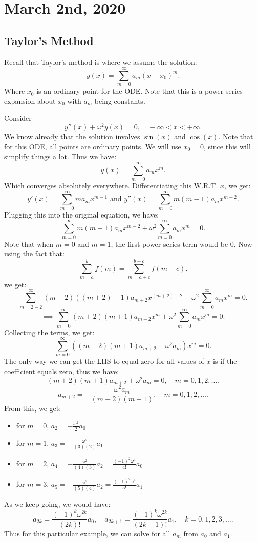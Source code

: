 \documentclass[../main/main.tex]{subfiles}
\begin{document}
\section{March  2nd, 2020}
\subsection{Taylor's Method}
Recall that Taylor's method is where we assume the solution: \[
	y(x) = \sum_{m=0}^{\infty} a_m(x-x_0)^{m}
.\] Where $x_0 $ is an ordinary point for the ODE. Note that this is a power series expansion about $x_0$ with $a_m$ being constants.

	Consider \[y''(x) + \omega^2 y(x) = 0, \quad -\infty < x < +\infty.\] We know already that the solution involves $\sin(x)$ and $\cos(x)$. Note that for this ODE, all points are ordinary points. We will use $x_0=0$, since this will simplify things a lot. Thus we have: \[
		y(x) = \sum_{m=0}^{\infty} a_mx^{m}
	.\] Which converges absolutely everywhere.  Differentiating this W.R.T. $x$, we get: \[
		y'(x) = \sum_{m=0}^{\infty} ma_mx^{m-1}\text{ and } y''(x) = \sum_{m=0}^{\infty} m(m-1)a_mx^{m-2}
	.\] Plugging this into the original equation, we have: \[
	\sum_{m=0}^{\infty} m(m-1)a_mx^{m-2} + \omega^2 \sum_{m=0}^{\infty} a_mx^{m}=0
.\] Note that when $m=0$ and $m=1$, the first power series term would be 0. Now using the fact that: \[
\sum_{m=a}^{b} f(m) = \sum_{m=a\pm c}^{b\pm c} f(m \mp c)
.\] we get: \[
\sum_{m=2-2}^{\infty} (m+2)((m+2)-1)a_{m+2}x^{(m+2)-2}+\omega^2 \sum_{m=0}^{\infty} a_m x^{m}=0
.\] \[
\implies \sum_{m=0}^{\infty} (m+2)(m+1) a_{m+2}x^{m}+\omega^2 \sum_{m=0}^{\infty} a_mx^{m}=0
.\] Collecting the terms, we get: \[
\sum_{m=0}^{\infty} \left( (m+2)(m+1) a_{m+2}+\omega^2 a_m \right) x^{m}=0
.\] 
The only way we can get the LHS to equal zero for all values of $x$ is if the coefficient equals zero, thus we have: \[
	(m+2) (m+1) a_{m+2}+\omega^2 a_m = 0, \quad m=0,1,2,\ldots 
.\] \[
a_{m+2}=- \frac{\omega^2a_m}{(m+2)(m+1)},\quad m=0,1,2,\ldots
.\] 
From this, we get: 
\begin{itemize}
	\item for $m=0$, $a_2=-\frac{\omega^2}{2}a_0$
	\item for $m=1$, $a_3=-\frac{\omega^2}{(3)(2)}a_1$
	\item for $m=2$, $a_4=-\frac{\omega^2}{(4)(3)}a_2=\frac{(-1)^2\omega^{4}}{4!}a_0$
	\item for $m=3$, $a_5=-\frac{\omega^2}{(5)(4)}a_2=\frac{(-1)^2\omega^{4}}{5!}a_1$
\end{itemize}
As we keep going, we would have: \[
	a_{2k}= \frac{(-1)^{k}\omega^{2k}}{(2k)!}a_0,\quad a_{2k+1} = \frac{(-1)^{k}\omega^{2k}}{(2k+1)!} a_1,\quad k=0,1,2,3,\ldots
.\] 
Thus for this particular example, we can solve for all $a_m$ from $a_0$  and $a_1$.
\end{document}
